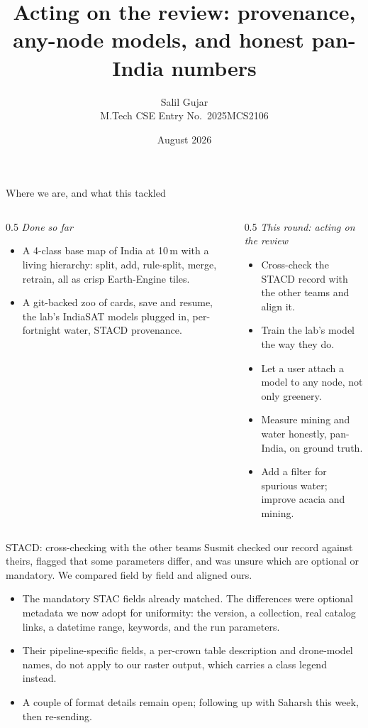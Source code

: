 \documentclass[aspectratio=169]{beamer}
\title[Review fixes, any-node models, pan-India eval]{Acting on the review: provenance, any-node models, and honest pan-India numbers}
\author[Salil Gujar]{Salil Gujar \\ \footnotesize M.Tech CSE \quad Entry No.\ 2025MCS2106}
\date{August 2026}
\begin{document}
\frame{\titlepage}

\begin{frame}{Where we are, and what this tackled}
\begin{columns}[T]
\begin{column}{0.5\textwidth}
\emph{Done so far}
\begin{itemize}\small
  \item A 4-class base map of India at 10\,m with a living hierarchy: split, add, rule-split, merge,
  retrain, all as crisp Earth-Engine tiles.
  \item A git-backed zoo of cards, save and resume, the lab's IndiaSAT models plugged in, per-fortnight
  water, STACD provenance.
\end{itemize}
\end{column}
\begin{column}{0.5\textwidth}
\emph{This round: acting on the review}
\begin{itemize}\small
  \item Cross-check the STACD record with the other teams and align it.
  \item Train the lab's model the way they do.
  \item Let a user attach a model to any node, not only greenery.
  \item Measure mining and water honestly, pan-India, on ground truth.
  \item Add a filter for spurious water; improve acacia and mining.
\end{itemize}
\end{column}
\end{columns}
\end{frame}

\begin{frame}{STACD: cross-checking with the other teams}
Susmit checked our record against theirs, flagged that some parameters differ, and was unsure which are
optional or mandatory. We compared field by field and aligned ours.
\begin{itemize}\small
  \item The mandatory STAC fields already matched. The differences were optional metadata we now adopt
  for uniformity: the version, a collection, real catalog links, a datetime range, keywords, and the run
  parameters.
  \item Their pipeline-specific fields, a per-crown table description and drone-model names, do not apply
  to our raster output, which carries a class legend instead.
  \item A couple of format details remain open; following up with Saharsh this week, then re-sending.
\end{itemize}
\end{frame}
\end{document}
